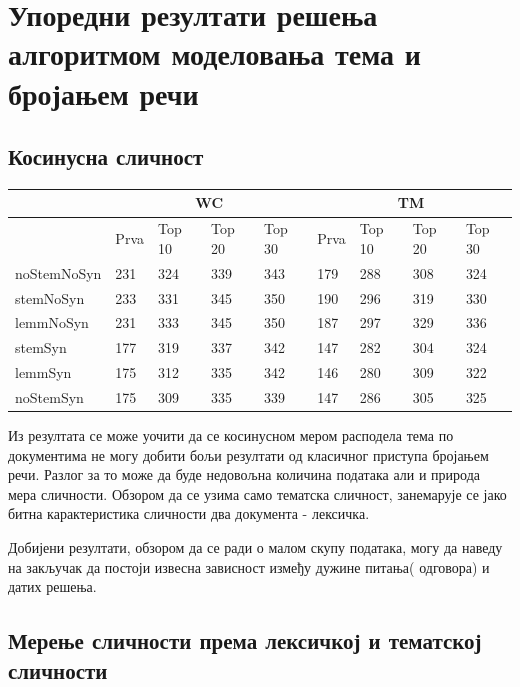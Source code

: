 \section{Упоредни резултати решења алгоритмом моделовања тема и бројањем речи}




\subsection{Косинусна сличност}

\begin{center}
\begin{tabular}{ | l | l | l | l | l || l | l | l | l | }
\hline
	 &\multicolumn{4}{|c||}{WC}  & \multicolumn{4}{|c|}{TM}  \\ \hline
	 & Prva & Top 10 & Top 20 & Top 30 & Prva & Top 10 & Top 20 & Top 30 \\ \hline
	noStemNoSyn & 231 & 324 & 339 & 343 & 179 & 288 & 308 & 324 \\ \hline
	stemNoSyn & 233 & 331 & 345 & 350 & 190 & 296 & 319 & 330 \\ \hline
	lemmNoSyn & 231 & 333 & 345 & 350 & 187 & 297 & 329 & 336 \\ \hline
	stemSyn & 177 & 319 & 337 & 342 & 147 & 282 & 304 & 324 \\ \hline
	lemmSyn & 175 & 312 & 335 & 342 & 146 & 280 & 309 & 322 \\ \hline
	noStemSyn & 175 & 309 & 335 & 339 & 147 & 286 & 305 & 325 \\ \hline
\end{tabular}
\end{center}

Из резултата се може уочити да се косинусном мером расподела тема по документима не могу добити бољи резултати од класичног приступа бројањем речи. Разлог за то може да буде недовољна количина података али и природа мера сличности. Обзором да се узима само тематска сличност, занемарује се јако битна карактеристика сличности два документа - лексичка.

Добијени резултати, обзором да се ради о малом скупу података, могу да наведу на закључак да постоји извесна зависност између дужине питања( одговора) и датих решења. 



\subsection{Мерење сличности према лексичкој и тематској сличности}

